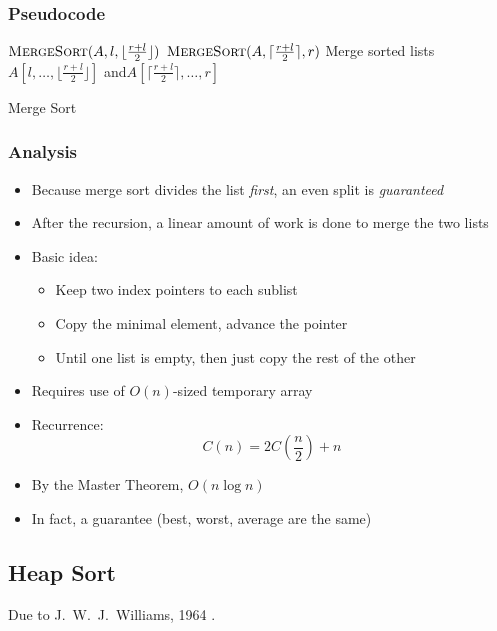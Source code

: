 \subsubsection{Pseudocode}

    \begin{algorithm}[H]
      {
        $\textsc{MergeSort}(A, l, \lfloor\frac{r+l}{2}\rfloor)$ \;
        $\textsc{MergeSort}(A, \lceil\frac{r+l}{2}\rceil, r)$ \;
        Merge sorted lists $A[l, \ldots, \lfloor\frac{r+l}{2}\rfloor]$ and$A[\lceil\frac{r+l}{2}\rceil, \ldots, r]$ \;
      }
    \caption{Merge Sort}
    \label{algo:mergeSort}
    \end{algorithm}

\subsubsection{Analysis}

\begin{itemize}
  \item Because merge sort divides the list \emph{first}, an even split is \emph{guaranteed}
  \item After the recursion, a linear amount of work is done to merge the two lists
  \item Basic idea:
	\begin{itemize}
	  \item Keep two index pointers to each sublist
	  \item Copy the minimal element, advance the pointer
	  \item Until one list is empty, then just copy the rest of the other
	\end{itemize}
  \item Requires use of $O(n)$-sized temporary array
  \item Recurrence:
	$$C(n) = 2C\left(\frac{n}{2}\right) + n$$
  \item By the Master Theorem, $O(n\log{n})$
  \item In fact, a guarantee (best, worst, average are the same)
\end{itemize}

\subsection{Heap Sort}

Due to J.\ W.\ J.\ Williams, 1964 \cite{williams1964algorithm}.

